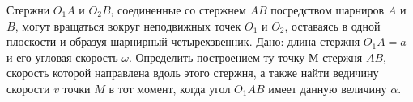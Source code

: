 Стержни $O_{1}A$ и $O_{2}B$, соединенные со стержнем $AB$ посредством шарниров $A$ и $B$, могут вращаться
вокруг неподвижных точек $O_{1}$ и $O_{2}$, оставаясь в одной плоскости и образуя шарнирный четырехзвенник.
Дано: длина стержня $O_{1}A=a$ и его угловая скорость $\omega$. Определить построением ту точку $М$ стержня
$AB$, скорость которой направлена вдоль этого стержня, а также найти ведичину скорости $v$ точки $M$ в тот момент,
когда угол $O_{1}AB$ имеет данную величину $\alpha$.
